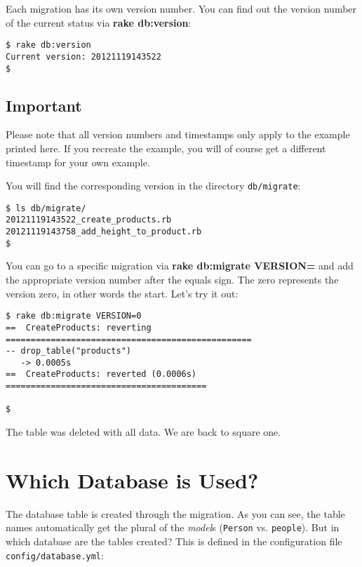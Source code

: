 \documentclass[a4paper]{book}
\newcounter{tab}[chapter]
\begin{document}
Each migration has its own version number. You can find out the version number of the current status via \textbf{rake db:version}:

\begin{shaded}\begin{verbatim}
$ rake db:version
Current version: 20121119143522
$
\end{verbatim}\end{shaded}

\subsection{Important}\label{important-10}

Please note that all version numbers and timestamps only apply to the example printed here. If you recreate the example, you will of course get a different timestamp for your own example.

You will find the corresponding version in the directory \texttt{db/migrate}:

\begin{shaded}\begin{verbatim}
$ ls db/migrate/
20121119143522_create_products.rb
20121119143758_add_height_to_product.rb
$
\end{verbatim}\end{shaded}

You can go to a specific migration via \textbf{rake db:migrate VERSION=} and add the appropriate version number after the equals sign. The zero represents the version zero, in other words the start. Let's try it out:

\begin{shaded}\begin{verbatim}
$ rake db:migrate VERSION=0
==  CreateProducts: reverting =================================================
-- drop_table("products")
   -> 0.0005s
==  CreateProducts: reverted (0.0006s) ========================================

$
\end{verbatim}\end{shaded}

The table was deleted with all data. We are back to square one.

\section{Which Database is Used?}\label{which-database-is-used}

The database table is created through the migration. As you can see, the table names automatically get the plural of the \emph{model}s (\texttt{Person} vs. \texttt{people}). But in which database are the tables created? This is defined in the configuration file \texttt{config/database.yml}:
\end{document}
